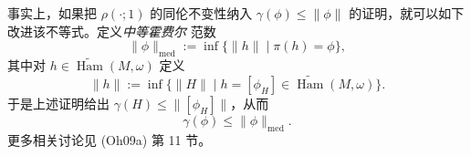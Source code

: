 \begin{remark}
\label{rem:22-medium-hofer-norm}
事实上，如果把 $\rho(\mathord\cdot;1)$ 的同伦不变性纳入
$\gamma(\phi)\leq\lVert\phi\rVert$ 的证明，就可以如下改进该不等式。定义\emph{中等霍费尔}
范数
\[
 \lVert\phi\rVert_{\mathrm{med}}
 :=\inf\{\lVert h\rVert\mid\pi(h)=\phi\},
\]
其中对 $h\in\widetilde{\operatorname{Ham}}(M,\omega)$ 定义
\[
 \lVert h\rVert:=\inf\{\lVert H\rVert
 \mid h=[\phi_H]\in\widetilde{\operatorname{Ham}}(M,\omega)\}.
\]
于是上述证明给出 $\gamma(H)\leq\lVert[\phi_H]\rVert$，从而
\[
 \gamma(\phi)\leq\lVert\phi\rVert_{\mathrm{med}}.
\]
更多相关讨论见 (Oh09a) 第 11 节。
\end{remark}
